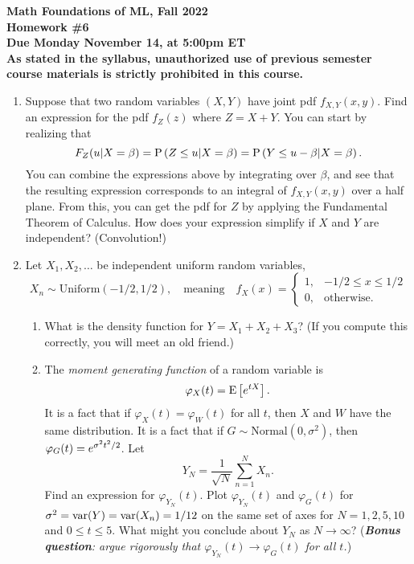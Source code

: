 \documentclass[11pt]{article}
\begin{document}

\noindent
{\bf\large Math Foundations of ML, Fall 2022} \\[3mm]
{\bf\large Homework \#6} \\[3mm]
{\bf Due Monday November 14, at 5:00pm ET}\\[3mm]

{\bf As stated in the syllabus, unauthorized use of previous semester course materials is strictly prohibited in this course.}

\begin{enumerate}


\item Suppose that two random variables $(X,Y)$ have joint pdf $f_{X,Y}(x,y)$.  Find an expression for the pdf $f_Z(z)$ where $Z=X+Y$.  You can start by realizing that 
\[
	F_Z(u|X=\beta) = \P{Z\leq u|X=\beta} = \P{Y\leq u-\beta|X=\beta}.
\]
You can combine the expressions above by integrating over $\beta$, and see that the resulting expression corresponds to an integral of $f_{X,Y}(x,y)$ over a half plane.  From this, you can get the pdf for $Z$ by applying the Fundamental Theorem of Calculus.  How does your expression simplify if $X$ and $Y$ are independent?  (Convolution!)

\vspace{4mm} 
\item Let $X_1,X_2,\ldots$ be independent uniform random variables,
\[
	X_n\sim\mathrm{Uniform}(-1/2,1/2),\quad\text{meaning}\quad 
	f_X(x) = \begin{cases} 1, & -1/2\leq x\leq 1/2 \\ 0, & \text{otherwise.} \end{cases}
\]
\begin{enumerate}

	\item What is the density function for $Y=X_1+X_2+X_3$?  (If you compute this correctly, you will meet an old friend.)
	
	\item The \emph{moment generating function} of a random variable is
	\[
		\varphi_X(t) = \E\left[\e^{tX}\right].
	\]
	It is a fact that if $\varphi_X(t)=\varphi_W(t)$ for all $t$, then $X$ and $W$ have the same distribution.  It is a fact that if $G\sim\mathrm{Normal}(0,\sigma^2)$, then $\varphi_G(t) = \e^{\sigma^2t^2/2}$.  Let
	\[
		Y_N = \frac{1}{\sqrt{N}}\sum_{n=1}^NX_n.
	\]
	Find an expression for $\varphi_{Y_N}(t)$.  Plot $\varphi_{Y_N}(t)$ and $\varphi_G(t)$ for $\sigma^2=\var(Y)=\var(X_n) = 1/12$ on the same set of axes for $N=1,2,5,10$ and $0\leq t\leq 5$.  What might you conclude about $Y_N$ as $N\rightarrow\infty$? (\emph{\textbf{Bonus question}: argue rigorously that $\varphi_{Y_N}(t)\rightarrow\varphi_G(t)$ for all $t$.})
	

\end{enumerate}
\end{enumerate}
\end{document}
